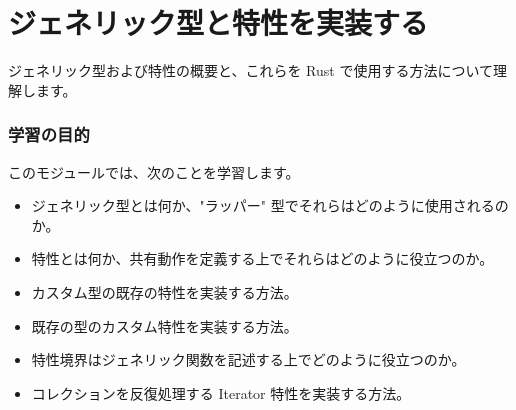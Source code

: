 \section{ジェネリック型と特性を実装する}

ジェネリック型および特性の概要と、これらを Rust で使用する方法について理解します。

\subsubsection{学習の目的}

このモジュールでは、次のことを学習します。

\begin{itemize}
\item ジェネリック型とは何か、"ラッパー" 型でそれらはどのように使用されるのか。
\item 特性とは何か、共有動作を定義する上でそれらはどのように役立つのか。
\item カスタム型の既存の特性を実装する方法。
\item 既存の型のカスタム特性を実装する方法。
\item 特性境界はジェネリック関数を記述する上でどのように役立つのか。
\item コレクションを反復処理する Iterator 特性を実装する方法。
\end{itemize}

